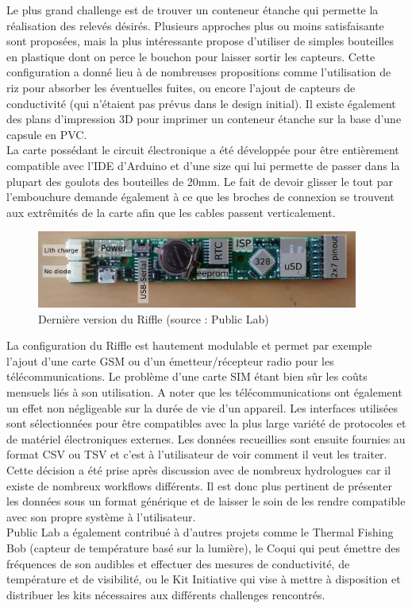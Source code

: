 \documentclass[10pt, article]{llncs}
\begin{document}
		Le plus grand challenge est de trouver un conteneur étanche qui permette la réalisation des relevés désirés. Plusieurs approches plus ou moins satisfaisante sont proposées, mais la plus intéressante propose d'utiliser de simples bouteilles en plastique dont on perce le bouchon pour laisser sortir les capteurs.
		Cette configuration a donné lieu à de nombreuses propositions comme l'utilisation de riz pour absorber les éventuelles fuites, ou encore l'ajout de capteurs de conductivité (qui n'étaient pas prévus dans le design initial). Il existe également des plans d'impression 3D pour imprimer un conteneur étanche sur la base d'une capsule en PVC.\\
		La carte possédant le circuit électronique a été développée pour être entièrement compatible avec l'IDE d'Arduino et d'une size qui lui permette de passer dans la plupart des goulots des bouteilles de 20mm. Le fait de devoir glisser le tout par l'embouchure demande également à ce que les broches de connexion se trouvent aux extrêmités de la carte afin que les cables passent verticalement.
		\begin{figure}
			\begin{center}
				\includegraphics[width=300pt]{img/riffle_parts_2.png}
			\end{center}
			\caption{Dernière version du Riffle (source : Public Lab)}
		\end{figure}
		La configuration du Riffle est hautement modulable et permet par exemple l'ajout d'une carte GSM ou d'un émetteur/récepteur radio pour les télécommunications.  Le problème d'une carte SIM étant bien sûr les coûts mensuels liés à son utilisation. A noter que les télécommunications ont également un effet non négligeable sur la durée de vie d'un appareil. Les interfaces utilisées sont sélectionnées pour être compatibles avec la plus large variété de protocoles et de matériel électroniques externes. Les données recueillies sont ensuite fournies au format CSV ou TSV et c'est à l'utilisateur de voir comment il veut les traiter. Cette décision a été prise après discussion avec de nombreux hydrologues car il existe de nombreux workflows différents. Il est donc plus pertinent de présenter les données sous un format générique et de laisser le soin de les rendre compatible avec son propre système à l'utilisateur.\\
		Public Lab a également contribué à d'autres projets comme le Thermal Fishing Bob (capteur de température basé sur la lumière), le Coqui qui peut émettre des fréquences de son audibles et effectuer des mesures de conductivité, de température et de visibilité, ou le Kit Initiative qui vise à mettre à disposition et distribuer les kits nécessaires aux différents challenges rencontrés.
	
\end{document}
